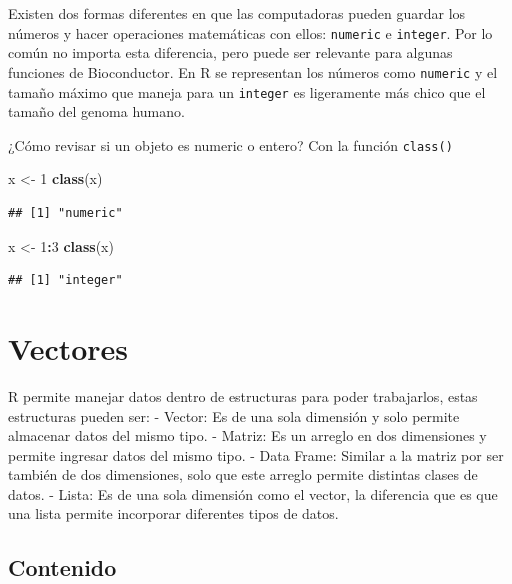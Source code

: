 \documentclass[
]{book}
\newenvironment{Shaded}{\begin{snugshade}}{\end{snugshade}}
\newcommand{\DecValTok}[1]{\textcolor[rgb]{0.00,0.00,0.81}{#1}}
\newcommand{\FunctionTok}[1]{\textcolor[rgb]{0.13,0.29,0.53}{\textbf{#1}}}
\newcommand{\NormalTok}[1]{#1}
\newcommand{\OtherTok}[1]{\textcolor[rgb]{0.56,0.35,0.01}{#1}}
\newcommand{\SpecialCharTok}[1]{\textcolor[rgb]{0.81,0.36,0.00}{\textbf{#1}}}
\begin{document}
Existen dos formas diferentes en que las computadoras pueden guardar los números y hacer operaciones matemáticas con ellos: \texttt{numeric} e \texttt{integer}.
Por lo común no importa esta diferencia, pero puede ser relevante para algunas funciones de Bioconductor. En R se representan los números como \texttt{numeric} y el tamaño máximo que maneja para un \texttt{integer} es ligeramente más chico que el tamaño del genoma humano.

¿Cómo revisar si un objeto es numeric o entero? Con la función \texttt{class()}

\begin{Shaded}
\begin{Highlighting}[]
\NormalTok{x }\OtherTok{\textless{}{-}} \DecValTok{1}
\FunctionTok{class}\NormalTok{(x)}
\end{Highlighting}
\end{Shaded}

\begin{verbatim}
## [1] "numeric"
\end{verbatim}

\begin{Shaded}
\begin{Highlighting}[]
\NormalTok{x }\OtherTok{\textless{}{-}} \DecValTok{1}\SpecialCharTok{:}\DecValTok{3}
\FunctionTok{class}\NormalTok{(x)}
\end{Highlighting}
\end{Shaded}

\begin{verbatim}
## [1] "integer"
\end{verbatim}

\hypertarget{estructura}{%
\chapter{Vectores}\label{estructura}}

R permite manejar datos dentro de estructuras para poder trabajarlos, estas estructuras pueden ser:
- Vector: Es de una sola dimensión y solo permite almacenar datos del mismo tipo.
- Matriz: Es un arreglo en dos dimensiones y permite ingresar datos del mismo tipo.
- Data Frame: Similar a la matriz por ser también de dos dimensiones, solo que este arreglo permite distintas clases de datos.
- Lista: Es de una sola dimensión como el vector, la diferencia que es que una lista permite incorporar diferentes tipos de datos.

\hypertarget{contenido}{%
\section{Contenido}\label{contenido}}
\end{document}
